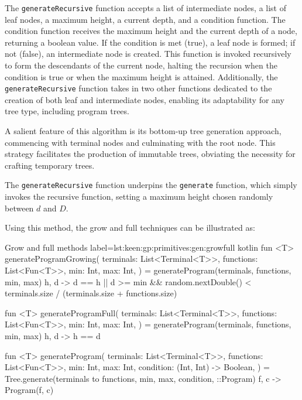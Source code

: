   The \texttt{generateRecursive} function accepts a list of intermediate nodes, 
  a list of leaf nodes, a maximum height, a current depth, and a condition 
  function. The condition function receives the maximum height and the current 
  depth of a node, returning a boolean value. If the condition is met (true), a 
  leaf node is formed; if not (false), an intermediate node is created. This 
  function is invoked recursively to form the descendants of the current node, 
  halting the recursion when the condition is true or when the maximum height is 
  attained. Additionally, the \texttt{generateRecursive} function takes in two 
  other functions dedicated to the creation of both leaf and intermediate nodes, 
  enabling its adaptability for any tree type, including program trees.

  A salient feature of this algorithm is its bottom-up tree generation approach, 
  commencing with terminal nodes and culminating with the root node. This 
  strategy facilitates the production of immutable trees, obviating the 
  necessity for crafting temporary trees.

  The \texttt{generateRecursive} function underpins the \texttt{generate} 
  function, which simply invokes the recursive function, setting a maximum 
  height chosen randomly between \(d\) and \(D\).

  Using this method, the grow and full techniques can be illustrated as:

  \begin{code}{Grow and full methods}{
    label=lst:keen:gp:primitives:gen:growfull
  }{kotlin}
    fun <T> generateProgramGrowing(
        terminals: List<Terminal<T>>,
        functions: List<Fun<T>>,
        min: Int,
        max: Int,
    ) = generateProgram(terminals, functions, min, max) { h, d ->
        d == h || d >= min && random.nextDouble() < terminals.size / (terminals.size + functions.size)
    }

    fun <T> generateProgramFull(
        terminals: List<Terminal<T>>, functions: List<Fun<T>>, min: Int, max: Int,
    ) = generateProgram(terminals, functions, min, max) { h, d -> h == d }
    
    fun <T> generateProgram(
        terminals: List<Terminal<T>>,
        functions: List<Fun<T>>,
        min: Int,
        max: Int,
        condition: (Int, Int) -> Boolean,
    ) = Tree.generate(terminals to functions, min, max, condition, ::Program) { f, c ->
        Program(f, c)
    }
  \end{code}

